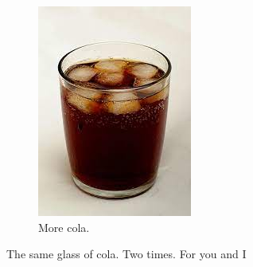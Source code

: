 \documentclass{article}
\begin{document}
\begin{figure}[h!]
\begin{subfigure}[b]{0.4\linewidth}
	    \includegraphics[width=\linewidth]{drink.jpg}
	    \caption{More cola.}
	    \end{subfigure}
        \caption{The same glass of cola. Two times. For you and I}
        \label{fig:cola}
	\end{figure}
\end{document}
